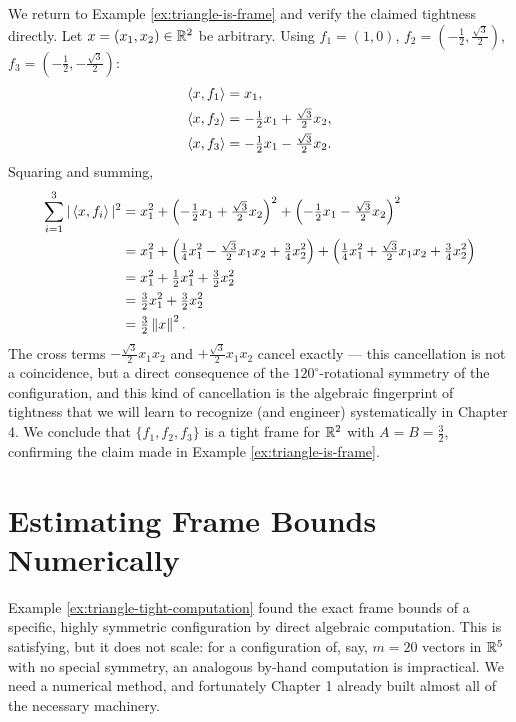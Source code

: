 \begin{examplebox}[title={Example 2.5: Verifying tightness of the triangular frame}]
\label{ex:triangle-tight-computation}
We return to Example \ref{ex:triangle-is-frame} and verify the claimed tightness directly. Let $x = (x_1, x_2) \in \mathbb{R}^2$ be arbitrary. Using $f_1 = (1,0)$, $f_2 = (-\tfrac12, \tfrac{\sqrt3}{2})$, $f_3 = (-\tfrac12, -\tfrac{\sqrt3}{2})$:
\begin{align*}
\left\langle x, f_1 \right\rangle &= x_1, \\
\left\langle x, f_2 \right\rangle &= -\tfrac12 x_1 + \tfrac{\sqrt3}{2} x_2, \\
\left\langle x, f_3 \right\rangle &= -\tfrac12 x_1 - \tfrac{\sqrt3}{2} x_2.
\end{align*}
Squaring and summing,
\begin{align*}
\sum_{i=1}^3 |\left\langle x, f_i \right\rangle|^2
&= x_1^2 + \left(-\tfrac12 x_1 + \tfrac{\sqrt3}{2} x_2\right)^2 + \left(-\tfrac12 x_1 - \tfrac{\sqrt3}{2}x_2\right)^2 \\
&= x_1^2 + \left(\tfrac14 x_1^2 - \tfrac{\sqrt3}{2}x_1x_2 + \tfrac34 x_2^2\right) + \left(\tfrac14 x_1^2 + \tfrac{\sqrt3}{2}x_1x_2 + \tfrac34 x_2^2\right) \\
&= x_1^2 + \tfrac12 x_1^2 + \tfrac32 x_2^2 \\
&= \tfrac32 x_1^2 + \tfrac32 x_2^2 \\
&= \tfrac32 \left\| x \right\|^2.
\end{align*}
The cross terms $-\tfrac{\sqrt3}{2}x_1x_2$ and $+\tfrac{\sqrt3}{2}x_1x_2$ cancel exactly --- this cancellation is not a coincidence, but a direct consequence of the $120^\circ$-rotational symmetry of the configuration, and this kind of cancellation is the algebraic fingerprint of tightness that we will learn to recognize (and engineer) systematically in Chapter 4. We conclude that $\{f_1, f_2, f_3\}$ is a tight frame for $\mathbb{R}^2$ with $A = B = \tfrac32$, confirming the claim made in Example \ref{ex:triangle-is-frame}.
\end{examplebox}

\section{Estimating Frame Bounds Numerically}
\label{sec:numerical-estimation}

Example \ref{ex:triangle-tight-computation} found the exact frame bounds of a specific, highly symmetric configuration by direct algebraic computation. This is satisfying, but it does not scale: for a configuration of, say, $m = 20$ vectors in $\mathbb{R}^5$ with no special symmetry, an analogous by-hand computation is impractical. We need a numerical method, and fortunately Chapter 1 already built almost all of the necessary machinery.

